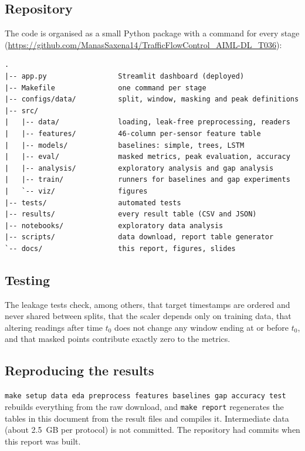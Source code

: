 \documentclass[11pt,a4paper]{article}
\newcommand{\repository}{\url{https://github.com/ManasSaxena14/TrafficFlowControl_AIML-DL_T036}}
\begin{document}
\subsection{Repository}
The code is organised as a small Python package with a command for every stage (\repository):
\begin{verbatim}
.
|-- app.py                 Streamlit dashboard (deployed)
|-- Makefile               one command per stage
|-- configs/data/          split, window, masking and peak definitions
|-- src/
|   |-- data/              loading, leak-free preprocessing, readers
|   |-- features/          46-column per-sensor feature table
|   |-- models/            baselines: simple, trees, LSTM
|   |-- eval/              masked metrics, peak evaluation, accuracy
|   |-- analysis/          exploratory analysis and gap analysis
|   |-- train/             runners for baselines and gap experiments
|   `-- viz/               figures
|-- tests/                 automated tests
|-- results/               every result table (CSV and JSON)
|-- notebooks/             exploratory data analysis
|-- scripts/               data download, report table generator
`-- docs/                  this report, figures, slides
\end{verbatim}

\subsection{Testing}
\begin{table}[ht]
\centering\small

\caption{Automated tests.}
\end{table}
The leakage tests check, among others, that target timestamps are ordered and never shared between splits, that the scaler depends only on training data, that altering readings after time $t_0$ does not change any window ending at or before $t_0$, and that masked points contribute exactly zero to the metrics.

\subsection{Reproducing the results}
\texttt{make setup data eda preprocess features baselines gap accuracy test} rebuilds everything from the raw download, and \texttt{make report} regenerates the tables in this document from the result files and compiles it.
Intermediate data (about 2.5~GB per protocol) is not committed.
The repository had \Commits{} commits when this report was built.
\end{document}
